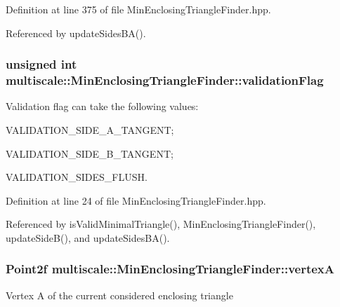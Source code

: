 \-Definition at line 375 of file \-Min\-Enclosing\-Triangle\-Finder.\-hpp.



\-Referenced by update\-Sides\-B\-A().

\hypertarget{classmultiscale_1_1MinEnclosingTriangleFinder_a19f9149638eddeec22b775eef632c6ef}{
\subsubsection[{validation\-Flag}]{\setlength{\rightskip}{0pt plus 5cm}unsigned int {\bf multiscale\-::\-Min\-Enclosing\-Triangle\-Finder\-::validation\-Flag}}}\label{classmultiscale_1_1MinEnclosingTriangleFinder_a19f9149638eddeec22b775eef632c6ef}
\-Validation flag can take the following values\-:
\begin{DoxyItemize}
\item \-V\-A\-L\-I\-D\-A\-T\-I\-O\-N\-\_\-\-S\-I\-D\-E\-\_\-\-A\-\_\-\-T\-A\-N\-G\-E\-N\-T;
\item \-V\-A\-L\-I\-D\-A\-T\-I\-O\-N\-\_\-\-S\-I\-D\-E\-\_\-\-B\-\_\-\-T\-A\-N\-G\-E\-N\-T;
\item \-V\-A\-L\-I\-D\-A\-T\-I\-O\-N\-\_\-\-S\-I\-D\-E\-S\-\_\-\-F\-L\-U\-S\-H. 
\end{DoxyItemize}

\-Definition at line 24 of file \-Min\-Enclosing\-Triangle\-Finder.\-hpp.



\-Referenced by is\-Valid\-Minimal\-Triangle(), \-Min\-Enclosing\-Triangle\-Finder(), update\-Side\-B(), and update\-Sides\-B\-A().

\hypertarget{classmultiscale_1_1MinEnclosingTriangleFinder_adb758ed8b7e8758436d9f1bb381e017e}{
\subsubsection[{vertex\-A}]{\setlength{\rightskip}{0pt plus 5cm}\-Point2f {\bf multiscale\-::\-Min\-Enclosing\-Triangle\-Finder\-::vertex\-A}}}\label{classmultiscale_1_1MinEnclosingTriangleFinder_adb758ed8b7e8758436d9f1bb381e017e}
\-Vertex \-A of the current considered enclosing triangle 

